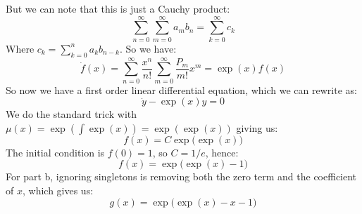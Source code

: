 \documentclass{article}
\begin{document}
        But we can note that this is just a Cauchy product:
        \begin{equation}
            \sum_{n=0}^{\infty}\sum_{m=0}^{\infty}
                a_{m}b_{n}
            =\sum_{k=0}^{\infty}c_{k}
        \end{equation}
        Where $c_{k}=\sum_{k=0}^{n}a_{k}b_{n-k}$. So we have:
        \begin{equation}
            \dot{f}(x)=
                \sum_{n=0}^{\infty}\frac{x^{n}}{n!}
                \sum_{m=0}^{\infty}\frac{P_{m}}{m!}x^{m}
                =\exp(x)f(x)
        \end{equation}
        So now we have a first order linear differential
        equation, which we can rewrite as:
        \begin{equation}
            \dot{y}-\exp(x)y=0
        \end{equation}
        We do the standard trick with
        $\mu(x)=\exp(\int\exp(x))=\exp(\exp(x))$ giving us:
        \begin{equation}
            f(x)=C\exp\big(\exp(x)\big)
        \end{equation}
        The initial condition is $f(0)=1$, so $C=1/e$, hence:
        \begin{equation}
            f(x)=\exp\big(\exp(x)-1\big)
        \end{equation}
        For part b, ignoring singletons is removing both the
        zero term and the coefficient of $x$, which gives us:
        \begin{equation}
            g(x)=\exp\big(\exp(x)-x-1\big)
        \end{equation}
\end{document}

